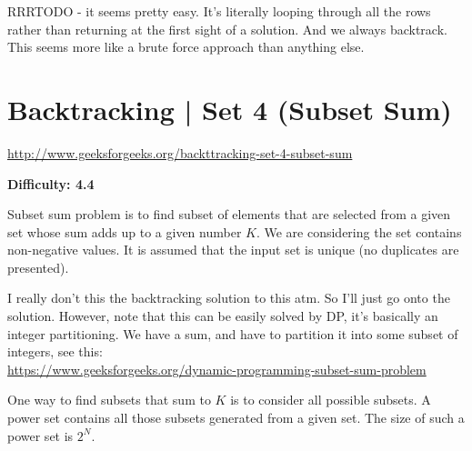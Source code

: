 \textbf{}

\RayNotesBegin

RRRTODO - it seems pretty easy. It's literally looping through all the
rows rather than returning at the first sight of a solution. And we always
backtrack. This seems more like a brute force approach than anything else.

\RayNotesEnd

\textbf{}




\section{Backtracking | Set 4 (Subset Sum)
  \label{secGFGBktrckSet4SubsetSum}}

\url{http://www.geeksforgeeks.org/backttracking-set-4-subset-sum}

\textbf{Difficulty: 4.4}

Subset sum problem is to find subset of elements that are selected from a
given set whose sum adds up to a given number $K$. We are considering the
set contains non-negative values. It is assumed that the input set is unique
(no duplicates are presented).

\textbf{}

\RayNotesBegin

I really don't this the backtracking solution to this atm. So I'll just go
onto the solution. However, note that this can be easily solved by DP, it's
basically an integer partitioning. We have a sum, and have to partition it
into some subset of integers, see this:\\
\url{https://www.geeksforgeeks.org/dynamic-programming-subset-sum-problem}

\RayNotesEnd

\textbf{}


One way to find subsets that sum to $K$ is to consider all possible subsets.
A power set contains all those subsets generated from a given set. The size
of such a power set is $2^N$.

